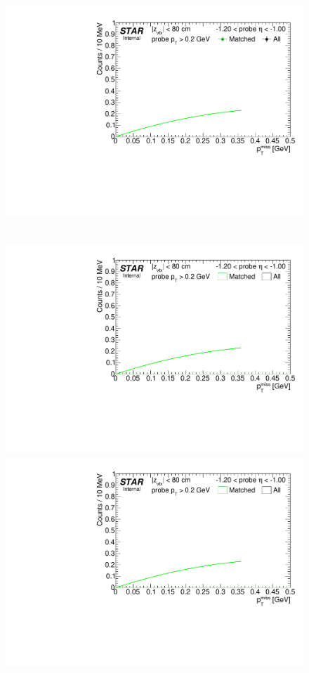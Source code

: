 \begin{figure}[ht]
{  \includegraphics[width=\linewidth,page=9]{graphics/systematicsEfficiency/TOF_tagAndProbe/Fitting_effVsEta_data.pdf}
}~
\parbox{0.495\textwidth}{
  \centering
  \includegraphics[width=\linewidth,page=6]{graphics/systematicsEfficiency/TOF_tagAndProbe/Fitting_effVsEta_mc.pdf}\\
  \includegraphics[width=\linewidth,page=7]{graphics/systematicsEfficiency/TOF_tagAndProbe/Fitting_effVsEta_mc.pdf}\\
}
\end{figure}
